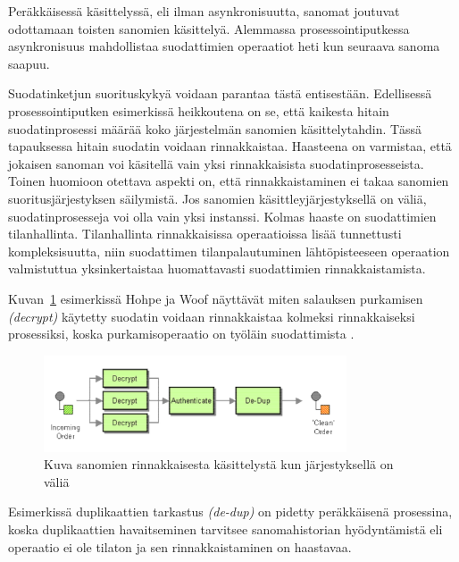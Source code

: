 \begin{itemize}
      Peräkkäisessä käsittelyssä, eli ilman asynkronisuutta, sanomat joutuvat odottamaan toisten sanomien käsittelyä. Alemmassa prosessointiputkessa asynkronisuus mahdollistaa suodattimien operaatiot heti kun seuraava sanoma saapuu.
      
      Suodatinketjun suorituskykyä voidaan parantaa tästä entisestään. Edellisessä prosessointiputken esimerkissä heikkoutena on se, että kaikesta hitain suodatinprosessi määrää koko järjestelmän sanomien käsittelytahdin. 
      Tässä tapauksessa hitain suodatin voidaan rinnakkaistaa. Haasteena on varmistaa, että jokaisen sanoman voi käsitellä vain yksi rinnakkaisista suodatinprosesseista. 
      Toinen huomioon otettava aspekti on, että rinnakkaistaminen ei takaa sanomien suoritusjärjestyksen säilymistä. Jos sanomien käsittleyjärjestyksellä on väliä, suodatinprosesseja voi olla vain yksi instanssi. 
      Kolmas haaste on suodattimien tilanhallinta. Tilanhallinta rinnakkaisissa operaatioissa lisää tunnettusti kompleksisuutta, niin suodattimen tilanpalautuminen lähtöpisteeseen operaation valmistuttua yksinkertaistaa huomattavasti suodattimien rinnakkaistamista.

      Kuvan~\ref{fig:parallelprocess} esimerkissä Hohpe ja Woof näyttävät miten salauksen purkamisen \textit{(decrypt)} käytetty suodatin voidaan rinnakkaistaa kolmeksi rinnakkaiseksi prosessiksi, koska purkamisoperaatio on työläin suodattimista \citep{Hohpe2004}.
      \begin{figure}[!h]
      \begin{center}
      \includegraphics[width=0.8\textwidth]{kuvat/paraller_processing.png}
      \caption{Kuva sanomien rinnakkaisesta käsittelystä kun järjestyksellä on väliä \citep{Hohpe2004}\label{fig:parallelprocess}}
      \end{center}
      \end{figure}
      Esimerkissä duplikaattien tarkastus \textit{(de-dup)} on pidetty peräkkäisenä prosessina, koska duplikaattien havaitseminen tarvitsee sanomahistorian hyödyntämistä eli operaatio ei ole tilaton ja sen rinnakkaistaminen on haastavaa. 


\end{itemize}
